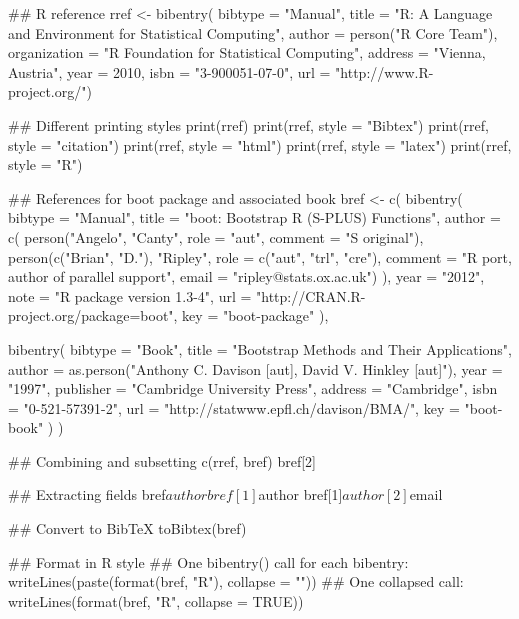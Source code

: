 %
\begin{SeeAlso}\relax
{}
\end{SeeAlso}
%
\begin{Examples}
\begin{ExampleCode}
## R reference
rref <- bibentry(
   bibtype = "Manual",
   title = "R: A Language and Environment for Statistical Computing",
   author = person("R Core Team"),
   organization = "R Foundation for Statistical Computing",
   address = "Vienna, Austria",
   year = 2010,
   isbn = "3-900051-07-0",
   url = "http://www.R-project.org/")

## Different printing styles
print(rref)
print(rref, style = "Bibtex")
print(rref, style = "citation")
print(rref, style = "html")
print(rref, style = "latex")
print(rref, style = "R")

## References for boot package and associated book
bref <- c(
   bibentry(
     bibtype = "Manual",
     title = "boot: Bootstrap R (S-PLUS) Functions",
     author = c(
       person("Angelo", "Canty", role = "aut",
         comment = "S original"),
       person(c("Brian", "D."), "Ripley", role = c("aut", "trl", "cre"),
         comment = "R port, author of parallel support",
         email = "ripley@stats.ox.ac.uk")
     ),
     year = "2012",
     note = "R package version 1.3-4",
     url = "http://CRAN.R-project.org/package=boot",
     key = "boot-package"
   ),

   bibentry(
     bibtype = "Book",
     title = "Bootstrap Methods and Their Applications",
     author = as.person("Anthony C. Davison [aut], David V. Hinkley [aut]"),
     year = "1997",
     publisher = "Cambridge University Press",
     address = "Cambridge",
     isbn = "0-521-57391-2",
     url = "http://statwww.epfl.ch/davison/BMA/",
     key = "boot-book"
   )
)

## Combining and subsetting
c(rref, bref)
bref[2]

## Extracting fields
bref$author
bref[1]$author
bref[1]$author[2]$email

## Convert to BibTeX
toBibtex(bref)

## Format in R style
## One bibentry() call for each bibentry:
writeLines(paste(format(bref, "R"), collapse = "\n\n"))
## One collapsed call:
writeLines(format(bref, "R", collapse = TRUE))
\end{ExampleCode}
\end{Examples}

